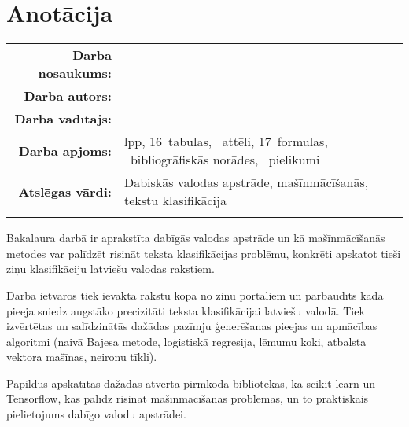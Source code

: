 \documentclass{VEA}
\newcounter{nofappendices}
\begin{document}

\tableofcontents
\clearpage


\pagestyle{plain}
\setcounter{page}{4}
\chapter*{Anotācija}

\begin{tabular}{@{}r@{}l@{}}
\parbox[c]{0.3\textwidth}{\textbf{Darba nosaukums:}}&
\parbox[t]{0.65\textwidth}{} \\
\parbox[c]{0.3\textwidth}{\textbf{Darba autors:}}&
\parbox[t]{0.65\textwidth}{} \\
\parbox[c]{0.3\textwidth}{\textbf{Darba vadītājs:}}&
\parbox[t]{0.65\textwidth}{} \\
\parbox[c]{0.3\textwidth}{\textbf{Darba apjoms:}}&
\parbox[t]{0.65\textwidth}{\textcolor{black}{\pageref{LastPage}} lpp, 16~tabulas,  ~attēli, 17~formulas, ~bibliogrāfiskās norādes, ~pielikumi} \\
\parbox[c]{0.3\textwidth}{\textbf{Atslēgas vārdi:}}&
\parbox[t]{0.65\textwidth}{Dabiskās valodas apstrāde, mašīnmācīšanās, tekstu klasifikācija} \\
&\\
\end{tabular}

Bakalaura darbā ir aprakstīta dabīgās valodas apstrāde un kā mašīnmācīšanās metodes var palīdzēt risināt teksta klasifikācijas problēmu, konkrēti apskatot tieši ziņu klasifikāciju latviešu valodas rakstiem.

Darba ietvaros tiek ievākta rakstu kopa no ziņu portāliem un pārbaudīts kāda pieeja sniedz augstāko precizitāti teksta klasifikācijai latviešu valodā. Tiek izvērtētas un salīdzinātās dažādas pazīmju ģenerēšanas pieejas un apmācības algoritmi (naivā Bajesa metode, loģistiskā regresija, lēmumu koki, atbalsta vektora mašīnas, neironu tīkli).

Papildus apskatītas dažādas atvērtā pirmkoda bibliotēkas, kā scikit-learn un Tensorflow, kas palīdz risināt mašīnmācīšanās problēmas, un to praktiskais pielietojums dabīgo valodu apstrādei.
\end{document}
